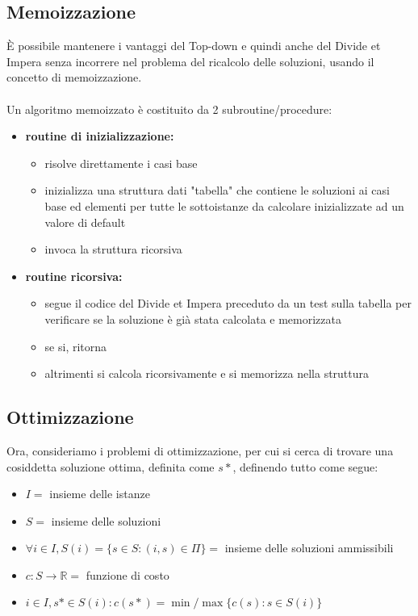 \subsection{Memoizzazione}
È possibile mantenere i vantaggi del Top-down e quindi anche del Divide et Impera senza incorrere nel problema del ricalcolo delle soluzioni, usando il concetto di memoizzazione. \\~\\

Un algoritmo memoizzato è costituito da 2 subroutine/procedure:
\begin{itemize}
    \item \textbf{routine di inizializzazione:}
    \begin{itemize}
        \item risolve direttamente i casi base
        \item inizializza una struttura dati "tabella" che contiene le soluzioni ai casi base ed elementi per tutte le sottoistanze da calcolare inizializzate ad un valore di default
        \item invoca la struttura ricorsiva
    \end{itemize}
    \item \textbf{routine ricorsiva:}
    \begin{itemize}
        \item segue il codice del Divide et Impera preceduto da un test sulla tabella per verificare se la soluzione è già stata calcolata e memorizzata
        \item se si, ritorna
        \item altrimenti si calcola ricorsivamente e si memorizza nella struttura
    \end{itemize}
\end{itemize}

\subsection{Ottimizzazione}
Ora, consideriamo i problemi di ottimizzazione, per cui si cerca di trovare una cosiddetta soluzione ottima, definita come $s*$, definendo tutto come segue:
\begin{itemize}
    \item $I =$ insieme delle istanze
    \item $S =$ insieme delle soluzioni
    \item $\forall i \in I, S(i) = \{s \in S: (i,s) \in \Pi\} =$ insieme delle soluzioni ammissibili
    \item $c: S \rightarrow \mathbb{R} =$ funzione di costo
    \item $i \in I, s* \in S(i): c(s*) = \min / \max \{c(s): s \in S(i)\}$
\end{itemize}

